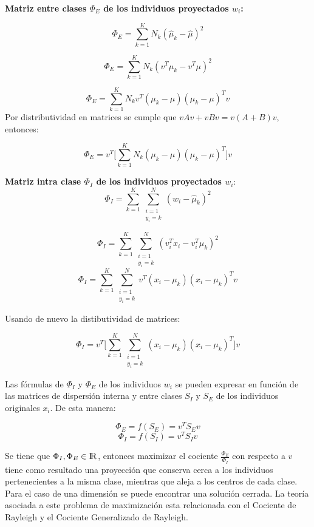 \textbf{Matriz entre clases $\Phi_{E}$ de los individuos proyectados $w_i$:}

$$\Phi_{E} = \sum\limits_{k =1}^{K} N_k (\widehat{\mu}_k - \widehat{\mu} )^2$$

$$\Phi_{E} = \sum\limits_{k =1}^{K} N_k (v^T \mu_k - v^T \mu)^2$$

$$\Phi_{E} =  \sum\limits_{k =1}^{K} N_k v^T ( \mu_k - \mu )(\mu_k - \mu )^T v $$
Por distributividad en matrices se cumple que $vAv+vBv =  v(A+B)v$, entonces:

\begin{equation}\label{eq:2.10}
\Phi_{E} = v^T \big[ \sum\limits_{k =1}^{K} N_k ( \mu_k - \mu )(\mu_k - \mu )^T \big] v	
\end{equation}

\textbf{Matriz intra clase $\Phi_{I}$ de los individuos proyectados $w_i$}:
$$\Phi_{I} = \sum\limits_{k = 1}^{K} \sum\limits_{\substack{i = 1\\
                            y_i = k}}^{N} (w_i - \widehat{\mu}_k)^2 $$

$$\Phi_{I} = \sum\limits_{k = 1}^{K} \sum\limits_{\substack{i = 1\\
                            y_i = k}}^{N} (v_i^T x_i - v_i^T \mu_k)^{2} $$
$$\Phi_{I} =  \sum\limits_{k = 1}^{K} \sum\limits_{\substack{i = 1\\
                            y_i = k}}^{ N} v^T( x_i - \mu_k) ( x_i - \mu_k)^T v  $$

Usando de nuevo la distibutividad de matrices:

\begin{equation}\label{eq:2.11}
\Phi_{I} = v^T \big[ \sum\limits_{k = 1}^{K} \sum\limits_{\substack{i = 1\\
                            y_i = k}}^{ N} ( x_i - \mu_k) ( x_i - \mu_k)^T \big] v	
\end{equation}


 Las fórmulas de $\Phi_{I}$ y $\Phi_{E}$ de los individuos $w_i$ se pueden expresar en función de las matrices de dispersión interna y entre clases $S_I$ y $S_E$ de los individuos originales $x_i$. De esta manera:

 $$\Phi_{E} = f(S_E) = v^T S_E v$$
 $$\Phi_{I} = f(S_I) = v^T S_I v$$

Se tiene que $\Phi_{I}, \Phi_{E} \in {\rm I\!R}$, entonces maximizar el cociente $\frac{\Phi_{E}}{\Phi_{I}}$ con respecto a $v$ tiene como resultado una proyección que conserva cerca a los individuos pertenecientes a la misma clase, mientras que aleja a los centros de cada clase. Para el caso de una dimensión se puede encontrar una solución cerrada. La teoría asociada a este problema de maximización esta relacionada con el Cociente de Rayleigh y el Cociente Generalizado de Rayleigh.

